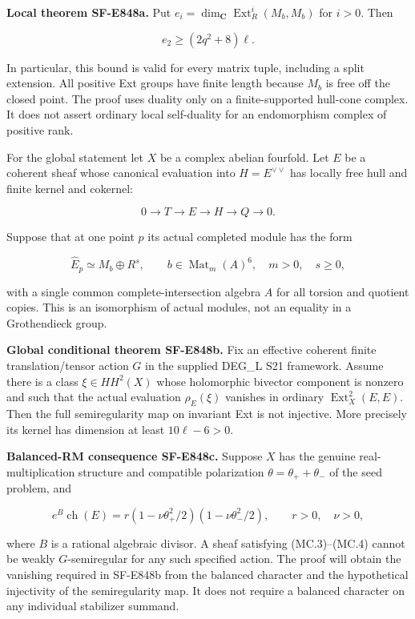 \textbf{Local theorem SF-E848a.} Put
\(e_i=\dim_{\mathbf C}\operatorname{Ext}^i_R(M_b,M_b)\) for \(i>0\).
Then

\[
 e_2\ge(2q^2+8)\ell.
 \tag{MC.2}
\]

In particular, this bound is valid for every matrix tuple, including a
split extension. All positive Ext groups have finite length because
\(M_b\) is free off the closed point. The proof uses duality only on
a finite-supported hull-cone complex. It does not assert ordinary local
self-duality for an endomorphism complex of positive rank.

For the global statement let \(X\) be a complex abelian fourfold. Let
\(E\) be a coherent sheaf whose canonical evaluation into
\(H=E^{\vee\vee}\) has locally free hull and finite kernel and cokernel:

\[
 0\longrightarrow T\longrightarrow E\longrightarrow H
        \longrightarrow Q\longrightarrow0.
 \tag{MC.3}
\]

Suppose that at one point \(p\) its actual completed module has the form

\[
 \widehat E_p\simeq M_b\oplus R^s,
 \qquad b\in\operatorname{Mat}_m(A)^6,
 \quad m>0,\quad s\ge0,
 \tag{MC.4}
\]

with a single common complete-intersection algebra \(A\) for all
torsion and quotient copies. This is an isomorphism of actual modules,
not an equality in a Grothendieck group.

\textbf{Global conditional theorem SF-E848b.} Fix an effective coherent finite
translation/tensor action \(G\) in the supplied DEG\_L S21 framework.
Assume there is a class \(\xi\in HH^2(X)\) whose holomorphic bivector
component is nonzero and such that the actual evaluation
\(\rho_E(\xi)\) vanishes in ordinary \(\operatorname{Ext}^2_X(E,E)\).
Then the full semiregularity map on invariant Ext is not injective.
More precisely its kernel has dimension at least \(10\ell-6>0\).

\textbf{Balanced-RM consequence SF-E848c.} Suppose \(X\) has the genuine
real-multiplication structure and compatible polarization
\(\theta=\theta_++\theta_-\) of the seed problem, and

\[
 e^B\operatorname{ch}(E)
   =r\left(1-\nu\theta_+^2/2\right)
        \left(1-\nu\theta_-^2/2\right),
 \qquad r>0,\quad\nu>0,
 \tag{MC.5}
\]

where \(B\) is a rational algebraic divisor. A sheaf satisfying
(MC.3)--(MC.4) cannot be weakly \(G\)-semiregular for any such specified
action. The proof will obtain the vanishing required in SF-E848b from
the balanced character and the hypothetical injectivity of the
semiregularity map. It does not require a balanced character on any
individual stabilizer summand.

